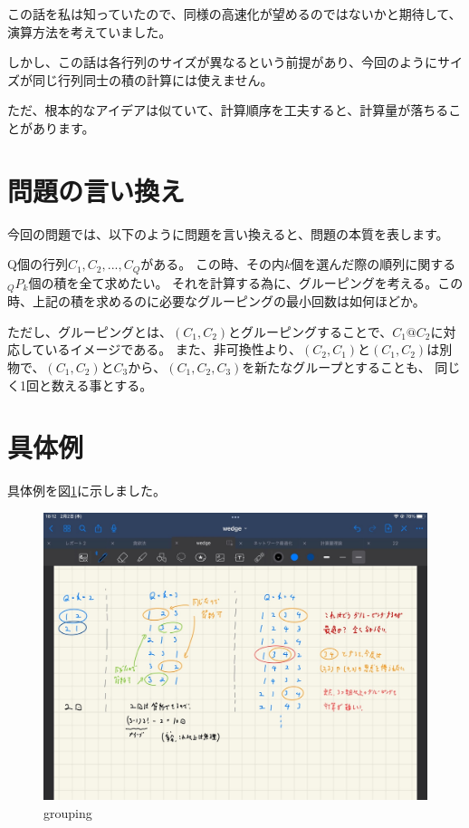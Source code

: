 \documentclass[a4paper, 10pt, dvipdfmx]{jlreq}
\begin{document}
この話を私は知っていたので、同様の高速化が望めるのではないかと期待して、演算方法を考えていました。

しかし、この話は各行列のサイズが異なるという前提があり、今回のようにサイズが同じ行列同士の積の計算には使えません。

ただ、根本的なアイデアは似ていて、計算順序を工夫すると、計算量が落ちることがあります。

\section{問題の言い換え}

今回の問題では、以下のように問題を言い換えると、問題の本質を表します。

Q個の行列$C_1,C_2,...,C_Q$がある。
この時、その内$k$個を選んだ際の順列に関する${}_Q P_k$個の積を全て求めたい。
それを計算する為に、グルーピングを考える。この時、上記の積を求めるのに必要なグルーピングの最小回数は如何ほどか。

ただし、グルーピングとは、$(C_1,C_2)$とグルーピングすることで、$C_1 @ C_2$に対応しているイメージである。
また、非可換性より、$(C_2,C_1)$と$(C_1,C_2)$は別物で、$(C_1,C_2)$と$C_3$から、$(C_1,C_2,C_3)$を新たなグループとすることも、
同じく1回と数える事とする。

\section{具体例}

具体例を図\ref{img:grouping}に示しました。

\begin{figure}[htbp]
    \begin{center}
        \includegraphics[width=150mm]{grouping.jpg}
        \caption{grouping}
        \label{img:grouping}
    \end{center}
\end{figure}
\end{document}
